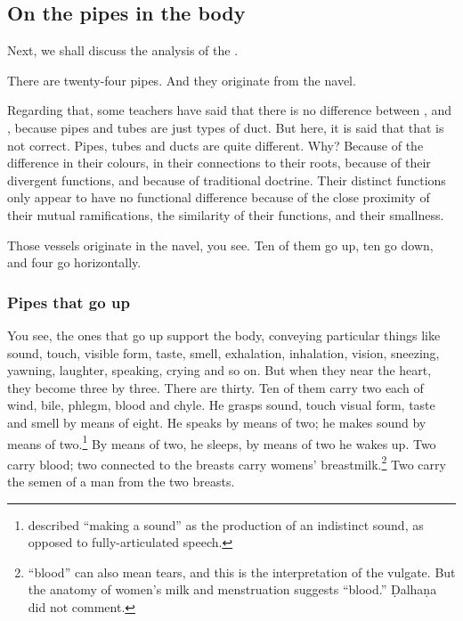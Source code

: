 \begin{translation}

\subsection{On the pipes in the body}

    \item [1]

    Next, we shall discuss the analysis  of the .

    \item[3]

    There are twenty-four pipes.  And they originate from the navel.

    Regarding that, some teachers have said that there is no difference
    between ,  and
    , because pipes and tubes are just types of duct.
    But here, it is said that that is not correct. Pipes, tubes  and ducts
    are quite different. Why? Because of the difference in their colours,
    in their connections to their roots, because of their divergent
    functions, and because of traditional doctrine. Their distinct
    functions only appear to have no functional difference because of the
    close proximity of their mutual ramifications, the similarity of their
    functions, and their smallness.

    \item[4]

    Those vessels originate in the navel, you see.  Ten of them go up, ten
    go down, and four go horizontally.

\subsubsection{Pipes that go up}
    \item[5]

    You see, the ones that go up support the body, conveying particular
    things like sound, touch, visible form, taste, smell, exhalation,
    inhalation, vision, sneezing, yawning, laughter, speaking, crying and
    so on.  But when they near the heart, they become three by three.
    There are thirty.  Ten of them carry two each of wind, bile, phlegm,
    blood and chyle. He grasps sound, touch visual form, taste and smell
    by means of eight. He speaks by means of two; he makes sound by means
    of two.\footnote{ described “making a sound” as
        the production of an indistinct sound, as opposed to fully-articulated
        speech.}  By means of two, he sleeps, by means of two he wakes up. Two
    carry blood;  two connected to the breasts carry womens'
    breastmilk.\footnote{ “blood” can also mean tears, and this
        is the interpretation of the vulgate.  But the anatomy of women's milk
        and menstruation suggests “blood.” Ḍalhaṇa did not comment.} Two carry
    the semen of a man from the two breasts.


\end{translation}
